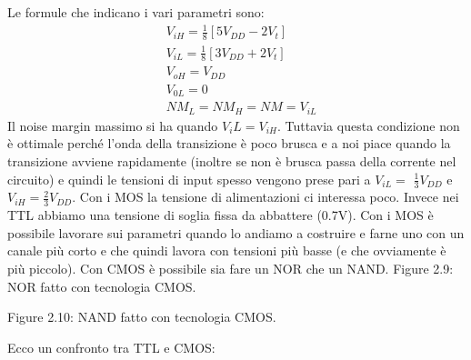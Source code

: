 \documentclass[
]{article}
\begin{document}
Le formule che indicano i vari parametri sono:
\[\begin{aligned}&V_{iH}=\frac{1}{8}[5V_{DD}-2V_{t}]\\&V_{iL}=\frac{1}{8}[3V_{DD}+2V_{t}]\\&V_{oH}=V_{DD}\\&V_{0L}=0\\&NM_{L}=NM_{H}=NM=V_{iL}\end{aligned}\]
Il noise margin massimo si ha quando \(V_iL=V_{iH}\). Tuttavia questa
condizione non è ottimale perché l'onda della transizione è poco brusca
e a noi piace quando la transizione avviene rapidamente (inoltre se non
è brusca passa della corrente nel circuito) e quindi le tensioni di
input spesso vengono prese pari a \(V_{iL}=\) \(\frac{1}{3}V_{DD}\)
e\(V_{iH}=\frac{2}{3}V_{DD}.\) Con i MOS la tensione di alimentazioni ci
interessa poco. Invece nei TTL abbiamo una tensione di soglia fissa da
abbattere (0.7V). Con i MOS è possibile lavorare sui parametri quando lo
andiamo a costruire e farne uno con un canale più corto e che quindi
lavora con tensioni più basse (e che ovviamente è più piccolo). Con CMOS
è possibile sia fare un NOR che un NAND. Figure 2.9: NOR fatto con
tecnologia CMOS.

Figure 2.10: NAND fatto con tecnologia CMOS.

Ecco un confronto tra TTL e CMOS:
\end{document}
